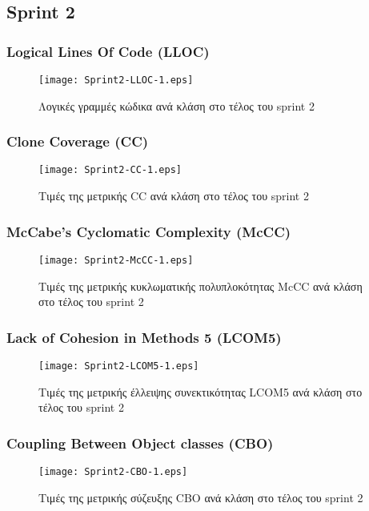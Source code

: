 \subsection{Sprint 2}

\subsubsection{Logical Lines Of Code (LLOC)}
\label{section:sprint2LLOC}

\begin{figure}
\centering
\texttt{[image: Sprint2-LLOC-1.eps]}
\caption{Λογικές γραμμές κώδικα ανά κλάση στο τέλος του sprint 2}
\label{fig:sprint2LLOC}
\end{figure}

\subsubsection{Clone Coverage (CC)}
\label{section:sprint2CC}

\begin{figure}
\centering
\texttt{[image: Sprint2-CC-1.eps]}
\caption{Τιμές της μετρικής CC ανά κλάση στο τέλος του sprint 2}
\label{fig:sprint2CC}
\end{figure}

\subsubsection{McCabe’s Cyclomatic Complexity (McCC)}
\label{section:sprint2McCC}

\begin{figure}
\centering
\texttt{[image: Sprint2-McCC-1.eps]}
\caption{Τιμές της μετρικής κυκλωματικής πολυπλοκότητας McCC ανά κλάση στο τέλος του sprint 2}
\label{fig:sprint2McCC}
\end{figure}

\subsubsection{Lack of Cohesion in Methods 5 (LCOM5)}
\label{section:sprint2LCOM5}

\begin{figure}
\centering
\texttt{[image: Sprint2-LCOM5-1.eps]}
\caption{Τιμές της μετρικής έλλειψης συνεκτικότητας LCOM5 ανά κλάση στο τέλος του sprint 2}
\label{fig:sprint2LCOM5}
\end{figure}

\subsubsection{Coupling Between Object classes (CBO)}
\label{section:sprint2CBO}

\begin{figure}
\centering
\texttt{[image: Sprint2-CBO-1.eps]}
\caption{Τιμές της μετρικής σύζευξης CBO ανά κλάση στο τέλος του sprint 2}
\label{fig:sprint2CBO}
\end{figure}
